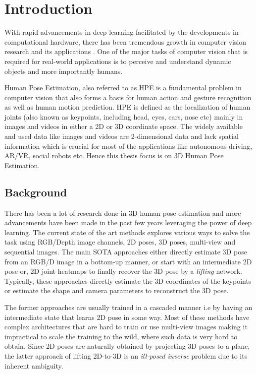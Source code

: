 \chapter{Introduction}
\label{chap:introduction}
With rapid advancements in deep learning facilitated by the developments in computational hardware, there has been tremendous growth in computer vision research and its applications \cite{AIandCompute}. One of the major tasks of computer vision that is required for real-world applications is to perceive and understand dynamic objects and more importantly humans.  

Human Pose Estimation, also referred to as HPE is a fundamental problem in computer vision that also forms a basis for human action and gesture recognition as well as human motion prediction. \ac{HPE} is defined as the localization of human joints (also known as keypoints, including head, eyes, ears, nose etc) mainly in images and videos in either a 2D or 3D coordinate space. The widely available and used data like images and videos are 2-dimensional data and lack spatial information which is crucial for most of the applications like autonomous driving, \ac{AR/VR}, social robots etc. Hence this thesis focus is on 3D Human Pose Estimation.

\section{Background}
\label{sec:background}

There has been a lot of research done in 3D human pose estimation and more advancements have been made in the past few years leveraging the power of deep learning. The current state of the art methods explores various ways to solve the task using \ac{RGB}/Depth image channels, 2D poses, 3D poses, multi-view and sequential images. The main \ac{SOTA} approaches either directly estimate 3D pose from an \ac{RGB}/D image in a bottom-up manner, or start with an intermediate 2D pose or, 2D joint heatmaps to finally recover the 3D pose by a \textit{lifting} network. Typically, these approaches directly estimate the 3D coordinates of the keypoints or estimate the shape and camera parameters to reconstruct the 3D pose.

The former approaches are usually trained in a cascaded manner i.e by having an intermediate state that learns 2D pose in some way. Most of these methods have complex architectures that are hard to train or use multi-view images making it impractical to scale the training to the wild, where such data is very hard to obtain. Since 2D poses are naturally obtained by projecting 3D poses to a plane, the latter approach of lifting 2D-to-3D is an \textit{ill-posed inverse} problem due to its inherent ambiguity. 

